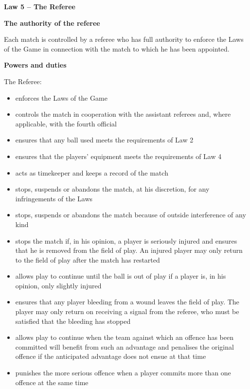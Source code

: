 \clearpage
\sffamily
{\bfseries\color[rgb]{0.4,0.4,0.4}
Law 5 -- The Referee}

\bigskip

{\bfseries The authority of the referee}

\headlinebox

Each match is controlled by a referee who has full authority to enforce the Laws of the Game in connection with the match to which he has been appointed.

\bigskip

{\bfseries Powers and duties}

\headlinebox

The Referee:

\begin{itemize}
\item enforces the Laws of the Game
\item controls the match in cooperation with the assistant referees and, where applicable, with the fourth official
\item ensures that any ball used meets the requirements of Law 2 
\item ensures that the players{\textquoteright} equipment meets the requirements of Law 4
\item acts as timekeeper and keeps a record of the match
\item stops, suspends or abandons the match, at his discretion, for any infringements of the Laws
\item stops, suspends or abandons the match because of outside interference of any kind
\item stops the match if, in his opinion, a player is seriously injured and ensures that he is removed from the field of play. An injured player may only return to the field of play after the match has restarted
\item allows play to continue until the ball is out of play if a player is, in his opinion, only slightly injured 
\item ensures that any player bleeding from a wound leaves the field of play. The player may only return on receiving a signal from the referee, who must be satisfied that the bleeding has stopped
\item allows play to continue when the team against which an offence has been committed will benefit from such an advantage and penalises the original offence if the anticipated advantage does not ensue at that time
\item punishes the more serious offence when a player commits more than one offence at the same time

\end{itemize}

